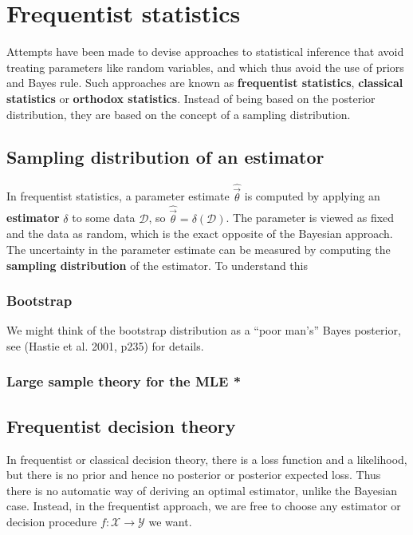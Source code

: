 \chapter{Frequentist statistics}
\label{Frequentist Statistics}

Attempts have been made to devise approaches to statistical inference that avoid treating parameters like random variables, and which thus avoid the use of priors and Bayes rule. Such approaches are known as \textbf{frequentist statistics}, \textbf{classical statistics} or \textbf{orthodox statistics}. Instead of being based on the posterior distribution, they are based on the concept of a sampling distribution.


\section{Sampling distribution of an estimator}
In frequentist statistics, a parameter estimate $\hat{\vec{\theta}}$ is computed by applying an \textbf{estimator} $\delta$ to some data $\mathcal{D}$, so $\hat{\vec{\theta}}=\delta(\mathcal{D})$. The parameter is viewed as fixed and the data as random, which is the exact opposite of the Bayesian approach. The uncertainty in the parameter estimate can be measured by computing the \textbf{sampling distribution} of the estimator. To understand this


\subsection{Bootstrap}
We might think of the bootstrap distribution as a “poor man’s” Bayes posterior, see (Hastie et al. 2001, p235) for details.


\subsection{Large sample theory for the MLE *}



\section{Frequentist decision theory}
In frequentist or classical decision theory, there is a loss function and a likelihood, but there is no prior and hence no posterior or posterior expected loss. Thus there is no automatic way of deriving an optimal estimator, unlike the Bayesian case. Instead, in the frequentist approach, we are free to choose any estimator or decision procedure $f: \mathcal{X} \rightarrow \mathcal{Y}$ we want.

